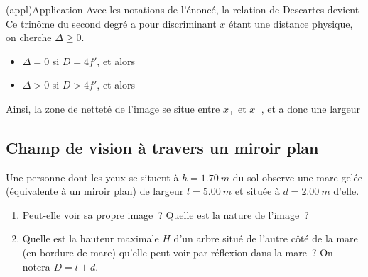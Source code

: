 \documentclass[../../main/main.tex]{subfiles}
\begin{document}
\begin{tcb}[sidebyside](appl){Application}
	Avec les notations de l'énoncé, la relation de Descartes devient
	Ce trinôme du second degré a pour discriminant
	\psw{
		\[
			\boxed{\Delta = D^2-4f'D = D(D-4f')}
		\]
	}
	\tcblower
	$x$ étant une distance physique, on cherche $\Delta \geq 0$.
	\begin{itemize}[label=$\diamond$, leftmargin=10pt]
		\item $\Delta = 0$ si $D = 4f'$, et alors
		      \psw{
			      \[
				      \boxed{x = \frac{D}{2}}
			      \]
		      }
		      \vspace{-20pt}
		\item $\Delta > 0$ si $D > 4f'$, et alors
		      \psw{
			      \[
				      \boxed{x_\pm = \frac{D\pm\sqrt{D(D-4f')}}{2}}
			      \]
		      }
		      \vspace{-20pt}
	\end{itemize}
	Ainsi, la zone de netteté de l'image se situe entre $x_+$ et $x_-$, et a
	donc une largeur
	\psw{
		\[
			\boxed{d = x_+ - x_- = \sqrt{D(D-4f')}}
		\]
	}
	\vspace{-20pt}
\end{tcb}

\subsection{Champ de vision à travers un miroir plan}
Une personne dont les yeux se situent à $h = \SI{1.70}{m}$ du sol observe une
mare gelée (équivalente à un miroir plan) de largeur $l = \SI{5.00}{m}$ et
située à $d = \SI{2.00}{m}$ d'elle.
\begin{enumerate}
	\item Peut-elle voir sa propre image~? Quelle est la nature de l'image~?
	\item Quelle est la hauteur maximale $H$ d'un arbre situé de l'autre côté de
	      la mare (en bordure de mare) qu'elle peut voir par réflexion dans la
	      mare~? On notera $D = l+d$.
\end{enumerate}
\end{document}
